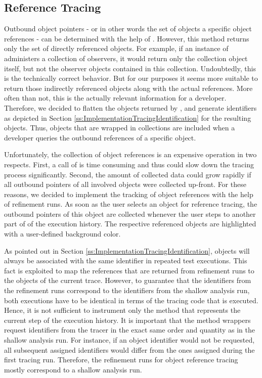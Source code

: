 \subsection{Reference Tracing}
\label{ss:ImplementationTracingReferences}
Outbound object pointers - or in other words the set of objects a specific object references - can be determined with the help of  .
However, this method returns only the set of directly referenced objects.
For example, if an instance of  administers a collection of observers, it would return only the collection object itself, but not the observer objects contained in this collection.
Undoubtedly, this is the technically correct behavior.
But for our purposes it seems more suitable to return those indirectly referenced objects along with the actual references. 
More often than not, this is the actually relevant information for a developer.
Therefore, we decided to flatten the objects returned by , and generate identifiers as depicted in Section \ref{ss:ImplementationTracingIdentification} for the resulting objects.
Thus, objects that are wrapped in collections are included when a developer queries the outbound references of a specific object.

Unfortunately, the collection of object references is an expensive operation in two respects.
First, a call of  is time consuming and thus could slow down the tracing process significantly.
Second, the amount of collected data could grow rapidly if all outbound pointers of all involved objects were collected up-front.
For these reasons, we decided to implement the tracking of object references with the help of refinement runs.
As soon as the user selects an object for reference tracing, the outbound pointers of this object are collected whenever the user steps to another part of of the execution history.
The respective referenced objects are highlighted with a user-defined background color.

As pointed out in Section \ref{ss:ImplementationTracingIdentification}, objects will always be associated with the same identifier in repeated test executions.
This fact is exploited to map the references that are returned from refinement runs to the objects of the current trace.
However, to guarantee that the identifiers from the refinement runs correspond to the identifiers from the shallow analysis run, both executions have to be identical in terms of the tracing code that is executed.
Hence, it is not sufficient to instrument only the method that represents the current step of the execution history.
It is important that the method wrappers request identifiers from the tracer in the exact same order and quantity as in the shallow analysis run.
For instance, if an object identifier would not be requested, all subsequent assigned identifiers would differ from the ones assigned during the first tracing run.
Therefore, the refinement runs for object reference tracing mostly correspond to a shallow analysis run.

